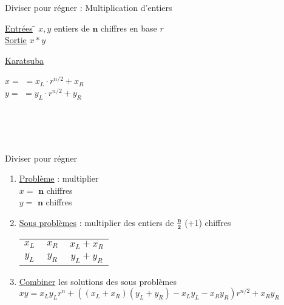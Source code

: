 \begin{frame}{Diviser pour régner : Multiplication d'entiers}
  \begin{tabbing}
  \underline{Entrées} \= $x,y$ entiers de $\mathbf{n}$ chiffres en base $r$ \\
  \underline{Sortie}  \>  $x*y$
\end{tabbing}

\underline{Karatsuba}
\begin{tabbing}
  $x  = $   $ = x_L\cdot{}r^{n/2} + x_R$ \\
  $y  = $   $ = y_L\cdot{}r^{n/2} + y_R$ \\
\end{tabbing}

 ~\\
 ~\\~\\

\end{frame}


\begin{frame}{Diviser pour régner}
  \begin{enumerate}
  \item<1-> \underline{Problème} : multiplier \\
  $x  = $   \hfill $\mathbf{n}$ chiffres \\
  $y  = $   \hfill $\mathbf{n}$ chiffres \\
  \item<2-> \underline{Sous problèmes} : multiplier des entiers de $\mathbf{\frac{n}{2}}$ (+1) chiffres
    \noindent\begin{tabular}[l]{ccc}
    $x_L$ & $~x_R$ & $~x_L+x_R$ \\
      $y_L$& $~y_R$ & $~y_L+y_R$ 
    \end{tabular}
    \item<3-> \underline{Combiner} les solutions des sous problèmes\\
      $xy = x_Ly_Lr^n + ((x_L+x_R)(y_L+y_R)-x_Ly_L - x_Ry_R)r^{n/2} + x_Ry_R$ \\
  \end{enumerate}
\end{frame}

